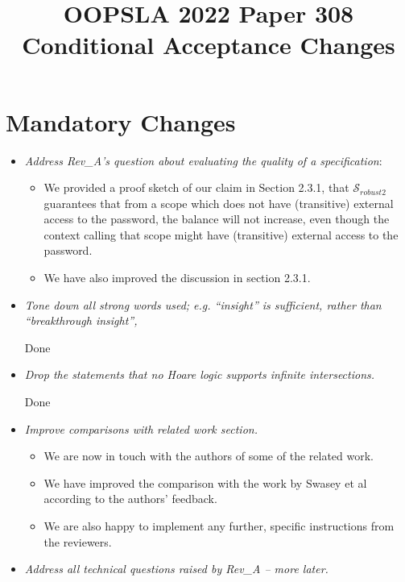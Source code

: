 \documentclass[11pt]{amsart}
\title{OOPSLA 2022 Paper 308 Conditional Acceptance Changes}
\begin{document}
\maketitle

\section{Mandatory Changes}

\begin{itemize}
\item
\emph{Address Rev\_A’s question about evaluating the quality of a specification}:

\begin{itemize}
\item
We provided a proof sketch of our claim in Section 2.3.1, that ${\mathcal S}_{robust2}$ guarantees that from a scope which does not
have (transitive) external access to the password, the balance will not increase, even though the context calling that scope might have
(transitive) external access to the password.

\item
We have also improved the discussion in section 2.3.1. 
\end{itemize}

\item
\emph{Tone down all strong words used;  e.g. “insight” is sufficient, rather than “breakthrough insight”,}

Done
\item
\emph{Drop the statements that no Hoare logic supports infinite intersections.}

Done
\item
\emph{Improve comparisons with related work section.}

\begin{itemize}
\item
We are now in touch with  the authors of some of the related work. 

\item
We have improved the comparison with the work by Swasey et al according to the authors' feedback. 

\item
We are also happy to implement any further, specific instructions from the reviewers. 
\end{itemize}

\item
\emph{Address all technical questions raised by Rev\_A -- more later.}


\end{itemize}
\end{document}
